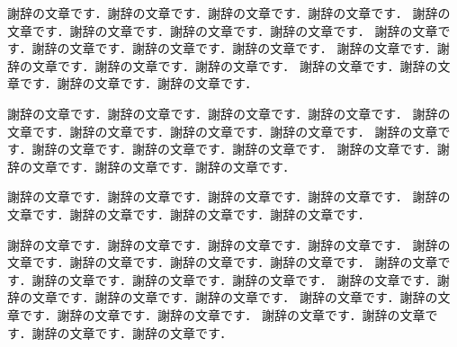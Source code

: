 謝辞の文章です．謝辞の文章です．謝辞の文章です．謝辞の文章です．
謝辞の文章です．謝辞の文章です．謝辞の文章です．謝辞の文章です．
謝辞の文章です．謝辞の文章です．謝辞の文章です．謝辞の文章です．
謝辞の文章です．謝辞の文章です．謝辞の文章です．謝辞の文章です．
謝辞の文章です．謝辞の文章です．謝辞の文章です．謝辞の文章です．

謝辞の文章です．謝辞の文章です．謝辞の文章です．謝辞の文章です．
謝辞の文章です．謝辞の文章です．謝辞の文章です．謝辞の文章です．
謝辞の文章です．謝辞の文章です．謝辞の文章です．謝辞の文章です．
謝辞の文章です．謝辞の文章です．謝辞の文章です．謝辞の文章です．

謝辞の文章です．謝辞の文章です．謝辞の文章です．謝辞の文章です．
謝辞の文章です．謝辞の文章です．謝辞の文章です．謝辞の文章です．

謝辞の文章です．謝辞の文章です．謝辞の文章です．謝辞の文章です．
謝辞の文章です．謝辞の文章です．謝辞の文章です．謝辞の文章です．
謝辞の文章です．謝辞の文章です．謝辞の文章です．謝辞の文章です．
謝辞の文章です．謝辞の文章です．謝辞の文章です．謝辞の文章です．
謝辞の文章です．謝辞の文章です．謝辞の文章です．謝辞の文章です．
謝辞の文章です．謝辞の文章です．謝辞の文章です．謝辞の文章です．

